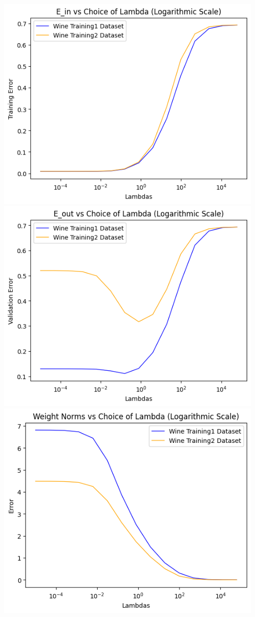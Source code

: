 \begin{solution}
  \\
  \includegraphics{images/P2_C_train_err.png} \\
  \includegraphics{images/P2_C_out_err.png} \\
  \includegraphics{images/P2_C_weights.png}

\end{solution}
